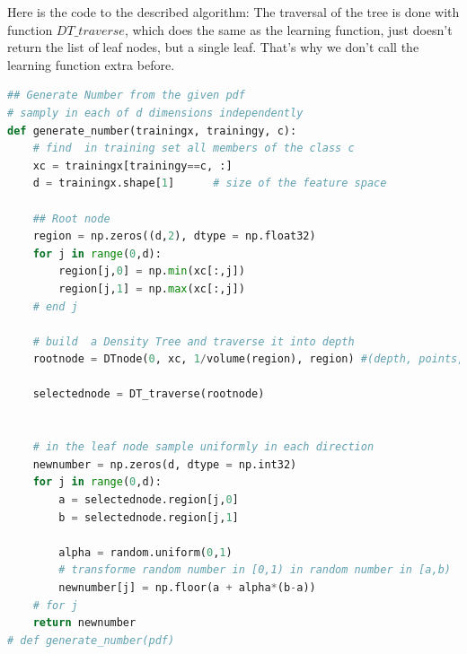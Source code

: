 \documentclass{article}
\begin{document}
Here is the code to the described algorithm:
The traversal of the tree is done with function $DT\_traverse$, which does the same as the learning function, just doesn't return the list of leaf nodes, but a single leaf. That's why we don't call the learning function extra before.

\begin{lstlisting}[language=Python]
## Generate Number from the given pdf
# samply in each of d dimensions independently
def generate_number(trainingx, trainingy, c):
    # find  in training set all members of the class c
    xc = trainingx[trainingy==c, :]        
    d = trainingx.shape[1]      # size of the feature space
    
    ## Root node
    region = np.zeros((d,2), dtype = np.float32)
    for j in range(0,d):
        region[j,0] = np.min(xc[:,j])
        region[j,1] = np.max(xc[:,j])
    # end j   
    
    # build  a Density Tree and traverse it into depth    
    rootnode = DTnode(0, xc, 1/volume(region), region) #(depth, points, p, region)
    
    selectednode = DT_traverse(rootnode)


    # in the leaf node sample uniformly in each direction
    newnumber = np.zeros(d, dtype = np.int32) 
    for j in range(0,d):
        a = selectednode.region[j,0]
        b = selectednode.region[j,1]
        
        alpha = random.uniform(0,1)
        # transforme random number in [0,1) in random number in [a,b)
        newnumber[j] = np.floor(a + alpha*(b-a))
    # for j    
    return newnumber
# def generate_number(pdf)    
\end{lstlisting}
\end{document}
